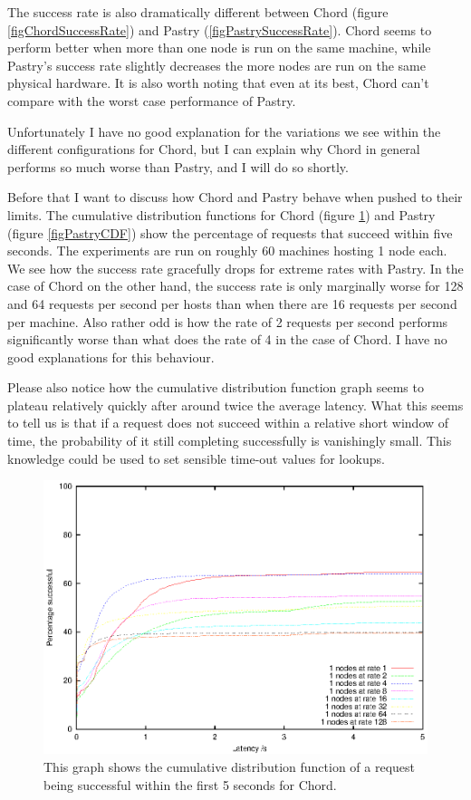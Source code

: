 The success rate is also dramatically different between Chord (figure \ref{figChordSuccessRate}) and Pastry (\ref{figPastrySuccessRate}). Chord seems to perform better when more than one node is run on the same machine, while Pastry's success rate slightly decreases the more nodes are run on the same physical hardware. It is also worth noting that even at its best, Chord can't compare with the worst case performance of Pastry.

Unfortunately I have no good explanation for the variations we see within the different configurations for Chord, but I can explain why Chord in general performs so much worse than Pastry, and I will do so shortly.

Before that I want to discuss how Chord and Pastry behave when pushed to their limits. The cumulative distribution functions for Chord (figure \ref{figChordCDF}) and Pastry (figure \ref{figPastryCDF}) show the percentage of requests that succeed within five seconds. The experiments are run on roughly 60 machines hosting 1 node each. We see how the success rate gracefully drops for extreme rates with Pastry.
In the case of Chord on the other hand, the success rate is only marginally worse for 128 and 64 requests per second per hosts than when there are 16 requests per second per machine. Also rather odd is how the rate of 2 requests per second performs significantly worse than what does the rate of 4 in the case of Chord. I have no good explanations for this behaviour.

Please also notice how the cumulative distribution function graph seems to plateau relatively quickly after around twice the average latency. What this seems to tell us is that if a request does not succeed within a relative short window of time, the probability of it still completing successfully is vanishingly small. This knowledge could be used to set sensible time-out values for lookups.

\begin{figure}[!htb]
  \begin{center}
    \includegraphics[width=0.9\linewidth]{illustrations/cdf_chord.eps}
    \caption{This graph shows the cumulative distribution function of a request being successful within the first 5 seconds for Chord.}
    \label{figChordCDF}
  \end{center}
\end{figure}


